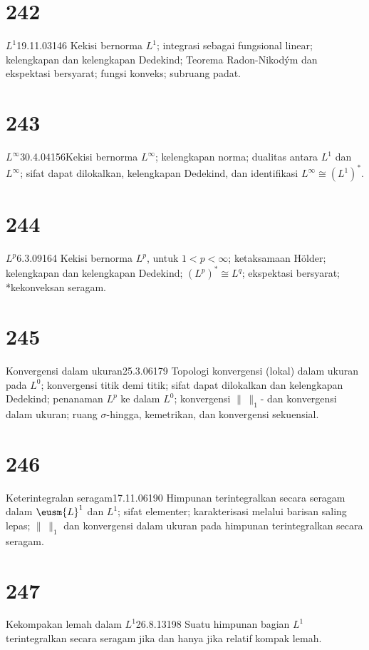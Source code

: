 \section{242}{$L^1$}{19.11.03}{146}{}
{Kekisi bernorma $L^1$; integrasi sebagai fungsional linear;
kelengkapan dan kelengkapan Dedekind; Teorema Radon-Nikod\'ym dan
ekspektasi bersyarat; fungsi konveks; subruang padat.}

\section{243}{$L^{\infty}$}{30.4.04}{156}{}{Kekisi bernorma
$L^{\infty}$; kelengkapan norma; dualitas
antara $L^1$ dan $L^{\infty}$; sifat dapat dilokalkan, kelengkapan
Dedekind, dan identifikasi $L^{\infty}\cong(L^1)^*$.}

\section{244}{$L^p$}{6.3.09}{164}{}
{Kekisi bernorma $L^p$, untuk $1<p<\infty$; ketaksamaan H\"older;
kelengkapan dan kelengkapan Dedekind;
$(L^p)^*\cong{L^q}$; ekspektasi bersyarat; *kekonveksan seragam.}

\section{245}{Konvergensi dalam ukuran}{25.3.06}{179}{}
{Topologi konvergensi (lokal) dalam ukuran pada $L^0$;
konvergensi titik demi titik; sifat dapat dilokalkan dan kelengkapan
Dedekind; penanaman $L^p$ ke dalam $L^0$; konvergensi
$\|\,\|_1$-\vthsp{} dan konvergensi dalam
ukuran; ruang $\sigma$-hingga, kemetrikan, dan konvergensi
sekuensial.}

\section{246}{Keterintegralan seragam}{17.11.06}{190}{}
{Himpunan terintegralkan secara seragam dalam $\eusm{L}^1$ dan $L^1$;
sifat elementer; karakterisasi melalui barisan saling lepas; $\|\,\|_1$
dan konvergensi dalam ukuran pada himpunan terintegralkan secara seragam.}

\section{247}{Kekompakan lemah dalam $L^1$}{26.8.13}{198}{}
{Suatu himpunan bagian $L^1$ terintegralkan secara seragam jika dan hanya
jika relatif kompak lemah.}

